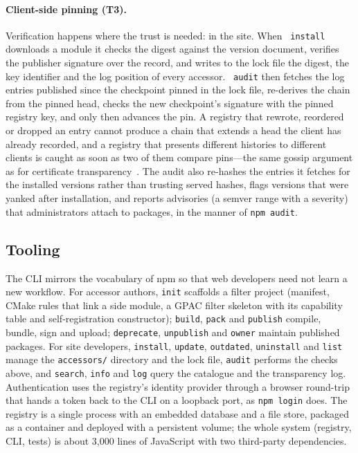 \paragraph{Client-side pinning (T3).}
Verification happens where the trust is needed: in the site. When
\texttt{\toolname{} install} downloads a module it checks the digest against
the version document, verifies the publisher signature over the record, and
writes to the lock file the digest, the key identifier and the log position of
every accessor. \texttt{\toolname{} audit} then fetches the log entries
published since the checkpoint pinned in the lock file, re-derives the chain
from the pinned head, checks the new checkpoint's signature with the pinned
registry key, and only then advances the pin. A registry that rewrote,
reordered or dropped an entry cannot produce a chain that extends a head the
client has already recorded, and a registry that presents different histories
to different clients is caught as soon as two of them compare pins---the same
gossip argument as for certificate transparency~\cite{rfc6962}. The audit also
re-hashes the entries it fetches for the installed versions rather than
trusting served hashes, flags versions that were yanked after installation,
and reports advisories (a semver range with a severity) that administrators
attach to packages, in the manner of \texttt{npm audit}.

\subsection{Tooling}
\label{sec:registry-tooling}

The CLI mirrors the vocabulary of npm so that web developers need not learn a
new workflow. For accessor authors, \texttt{init} scaffolds a filter project
(manifest, CMake rules that link a side module, a GPAC filter skeleton with
its capability table and self-registration constructor);
\texttt{build}, \texttt{pack} and \texttt{publish} compile, bundle, sign and
upload; \texttt{deprecate}, \texttt{unpublish} and \texttt{owner} maintain
published packages. For site developers, \texttt{install}, \texttt{update},
\texttt{outdated}, \texttt{uninstall} and \texttt{list} manage the
\texttt{accessors/} directory and the lock file, \texttt{audit} performs the
checks above, and \texttt{search}, \texttt{info} and \texttt{log} query the
catalogue and the transparency log. Authentication uses the registry's
identity provider through a browser round-trip that hands a token back to the
CLI on a loopback port, as \texttt{npm login} does. The registry is a single
process with an embedded database and a file store, packaged as a container
and deployed with a persistent volume; the whole system (registry, CLI, tests)
is about 3,000 lines of JavaScript with two third-party dependencies.

